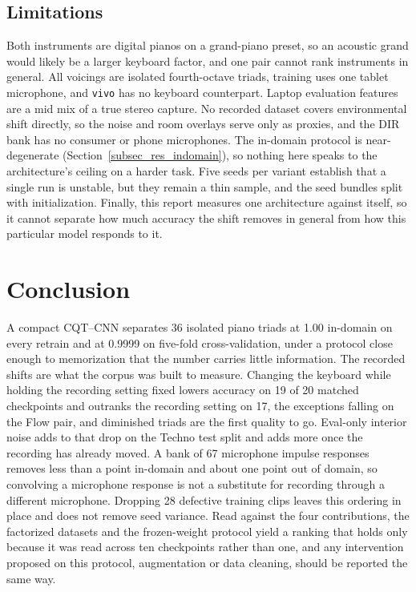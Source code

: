 \documentclass[pdflatex,sn-mathphys-num,iicol]{sn-jnl}
\begin{document}
\subsection{Limitations}\label{subsec_limitations}

Both instruments are digital pianos on a grand-piano preset, so an acoustic grand would likely be a larger keyboard factor, and one pair cannot rank instruments in general. All voicings are isolated fourth-octave triads, training uses one tablet microphone, and \texttt{vivo} has no keyboard counterpart. Laptop evaluation features are a mid mix of a true stereo capture. No recorded dataset covers environmental shift directly, so the noise and room overlays serve only as proxies, and the DIR bank has no consumer or phone microphones. The in-domain protocol is near-degenerate (Section~\ref{subsec_res_indomain}), so nothing here speaks to the architecture's ceiling on a harder task. Five seeds per variant establish that a single run is unstable, but they remain a thin sample, and the seed bundles split with initialization. Finally, this report measures one architecture against itself, so it cannot separate how much accuracy the shift removes in general from how this particular model responds to it.

\section{Conclusion}\label{sec_conclusion}

A compact CQT--CNN separates 36 isolated piano triads at 1.00 in-domain on every retrain and at 0.9999 on five-fold cross-validation, under a protocol close enough to memorization that the number carries little information. The recorded shifts are what the corpus was built to measure. Changing the keyboard while holding the recording setting fixed lowers accuracy on 19 of 20 matched checkpoints and outranks the recording setting on 17, the exceptions falling on the Flow pair, and diminished triads are the first quality to go. Eval-only interior noise adds to that drop on the Techno test split and adds more once the recording has already moved. A bank of 67 microphone impulse responses removes less than a point in-domain and about one point out of domain, so convolving a microphone response is not a substitute for recording through a different microphone. Dropping 28 defective training clips leaves this ordering in place and does not remove seed variance. Read against the four contributions, the factorized datasets and the frozen-weight protocol yield a ranking that holds only because it was read across ten checkpoints rather than one, and any intervention proposed on this protocol, augmentation or data cleaning, should be reported the same way.
\end{document}
